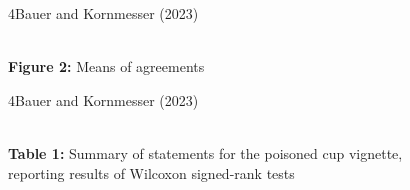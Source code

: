 \documentclass[xcolor=table,9pt,aspectratio=169]{beamer}
\begin{document}
\begin{frame}{\vspace*{10mm}4\hspace*{1em}Bauer and Kornmesser (2023)}
\vspace*{-5mm}
\begin{center}
      \\
   {\footnotesize\textbf{Figure 2:} Means of agreements}
\end{center}
\end{frame}


\begin{frame}{\vspace*{10mm}4\hspace*{1em}Bauer and Kornmesser (2023)}
\vspace*{-5mm}
\begin{center}
   \\
   {\footnotesize\textbf{Table 1:} Summary of statements for the poisoned cup vignette,\\reporting results of Wilcoxon signed-rank tests}
\end{center}
\end{frame}
\end{document}
